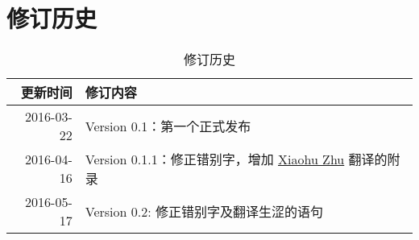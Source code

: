 
\chapter{修订历史}

\begin{table}[h]
  \centering
  \begin{tabularx}{0.9\textwidth}{ r X }
    \toprule
    \textbf{更新时间} & \textbf{修订内容}\\
		\midrule
    2016-03-22 & Version 0.1：第一个正式发布\\
    \midrule
    2016-04-16 & Version 0.1.1：修正错别字，增加 \href{mailto:xhzhu.nju@gmail}{Xiaohu Zhu} 翻译的附录\\
    \midrule
    2016-05-17 & Version 0.2: 修正错别字及翻译生涩的语句 \\
    \bottomrule
  \end{tabularx}
  \caption{修订历史}
\label{table:DocumentChanges}
\end{table}
